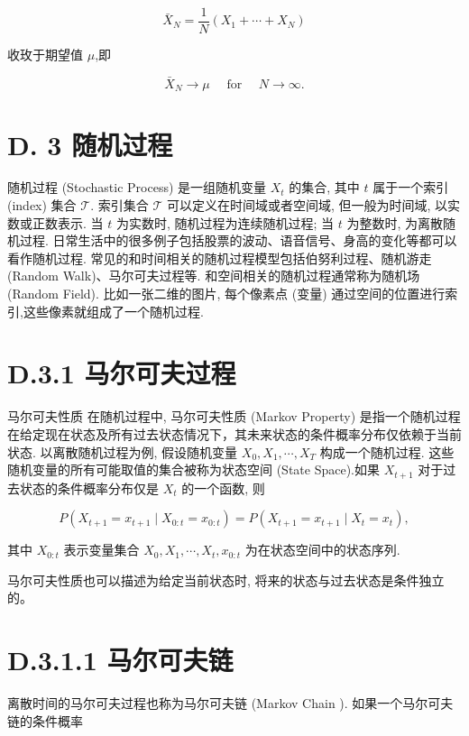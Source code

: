 \documentclass[10pt]{article}
\begin{document}
\begin{equation*}
\bar{X}_{N}=\frac{1}{N}\left(X_{1}+\cdots+X_{N}\right) \tag{D.43}
\end{equation*}


收玫于期望值 $\mu$,即


\begin{equation*}
\bar{X}_{N} \rightarrow \mu \quad \text { for } \quad N \rightarrow \infty . \tag{D.44}
\end{equation*}


\section*{D. 3 随机过程}
随机过程 (Stochastic Process) 是一组随机变量 $X_{t}$ 的集合, 其中 $t$ 属于一个索引 (index) 集合 $\mathcal{T}$. 索引集合 $\mathcal{T}$ 可以定义在时间域或者空间域, 但一般为时间域, 以实数或正数表示. 当 $t$ 为实数时, 随机过程为连续随机过程; 当 $t$ 为整数时, 为离散随机过程. 日常生活中的很多例子包括股票的波动、语音信号、身高的变化等都可以看作随机过程. 常见的和时间相关的随机过程模型包括伯努利过程、随机游走 (Random Walk)、马尔可夫过程等. 和空间相关的随机过程通常称为随机场 (Random Field). 比如一张二维的图片, 每个像素点 (变量) 通过空间的位置进行索引,这些像素就组成了一个随机过程.

\section*{D.3.1 马尔可夫过程}
马尔可夫性质 在随机过程中, 马尔可夫性质 (Markov Property) 是指一个随机过程在给定现在状态及所有过去状态情况下，其未来状态的条件概率分布仅依赖于当前状态. 以离散随机过程为例, 假设随机变量 $X_{0}, X_{1}, \cdots, X_{T}$ 构成一个随机过程. 这些随机变量的所有可能取值的集合被称为状态空间 (State Space).如果 $X_{t+1}$ 对于过去状态的条件概率分布仅是 $X_{t}$ 的一个函数, 则


\begin{equation*}
P\left(X_{t+1}=x_{t+1} \mid X_{0: t}=x_{0: t}\right)=P\left(X_{t+1}=x_{t+1} \mid X_{t}=x_{t}\right), \tag{D.45}
\end{equation*}


其中 $X_{0: t}$ 表示变量集合 $X_{0}, X_{1}, \cdots, X_{t}, x_{0: t}$ 为在状态空间中的状态序列.

马尔可夫性质也可以描述为给定当前状态时, 将来的状态与过去状态是条件独立的。

\section*{D.3.1.1 马尔可夫链}
离散时间的马尔可夫过程也称为马尔可夫链 (Markov Chain ). 如果一个马尔可夫链的条件概率
\end{document}
